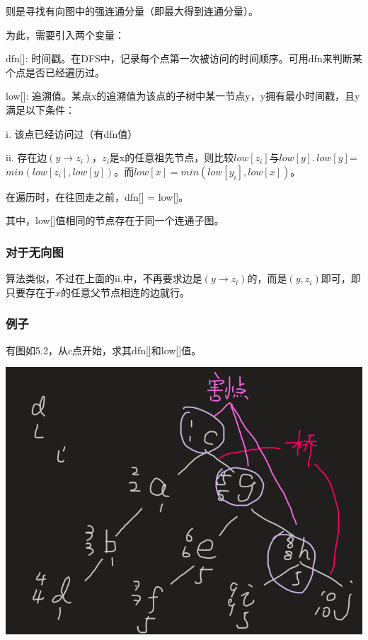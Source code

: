 \documentclass[a4paper]{article}    %
\begin{document}
则是寻找有向图中的强连通分量（即最大得到连通分量）。

为此，需要引入两个变量：

\indent\indent dfn[]: 时间戳。在DFS中，记录每个点第一次被访问的时间顺序。可用dfn来判断某个点是否已经遍历过。

\indent\indent low[]: 追溯值。某点x的追溯值为该点的子树中某一节点y，y拥有最小时间戳，且y满足以下条件：

\indent\indent\indent i. 该点已经访问过（有dfn值）

\indent\indent\indent ii. 存在边$(y\rightarrow z_i)$，$z_i$是x的任意祖先节点，则比较$low[z_i]$与$low[y].\,low[y]$=$min(low[z_i],low[y])$。而$low[x] = min(low[y_i],low[x])$。

在遍历时，在往回走之前，dfn[] = low[]。

其中，low[]值相同的节点存在于同一个连通子图。

\subsubsection{对于无向图}

算法类似，不过在上面的ii.中，不再要求边是$(y\rightarrow z_i)$的，而是$(y,z_i)$即可，即只要存在于$x$的任意父节点相连的边就行。

\subsubsection{例子}

有图如5.2，从c点开始，求其dfn[]和low[]值。

\begin{center}
    \includegraphics[scale=0.6]{46.png}
\end{center}
\end{document}
